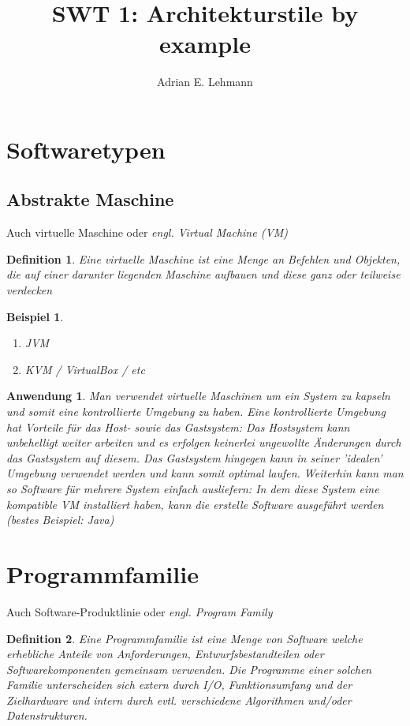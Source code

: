 \documentclass[a4paper]{article}
\title{SWT 1: Architekturstile by example}
\author{Adrian E. Lehmann}
\theoremstyle{break}
\newtheorem{defi}{Definition}[section]
\newtheorem{ex}{Beispiel}[section]
\newtheorem{why}{Anwendung}[section]
\begin{document}
	\maketitle
	\tableofcontents
	\newpage
	

\section{Softwaretypen}
\subsection{Abstrakte Maschine}
Auch virtuelle Maschine oder \textit{engl. Virtual Machine (VM)}
\begin{defi}
	Eine virtuelle Maschine ist eine Menge an Befehlen und Objekten, die auf einer darunter liegenden Maschine aufbauen und diese ganz oder teilweise verdecken
\end{defi}

\begin{ex}
\begin{enumerate}
	\item JVM
	\item KVM / VirtualBox / etc
\end{enumerate}
\end{ex}

\begin{why}
		Man verwendet virtuelle Maschinen um ein System zu kapseln und somit eine kontrollierte Umgebung zu haben. Eine kontrollierte Umgebung hat Vorteile für das Host- sowie das Gastsystem: Das Hostsystem kann unbehelligt weiter arbeiten und es erfolgen keinerlei ungewollte Änderungen durch das Gastsystem auf diesem. Das Gastsystem hingegen kann in seiner 'idealen' Umgebung verwendet werden und kann somit optimal laufen. Weiterhin kann man so Software für mehrere System einfach ausliefern: In dem diese System eine kompatible VM installiert haben, kann die erstelle Software ausgeführt werden (bestes Beispiel: Java)
\end{why}

\section{Programmfamilie}
Auch Software-Produktlinie oder \textit{engl. Program Family}
\begin{defi}
	Eine Programmfamilie ist eine Menge von Software welche erhebliche Anteile von Anforderungen, Entwurfsbestandteilen oder Softwarekomponenten gemeinsam verwenden.
	Die Programme einer solchen Familie unterscheiden sich extern durch I/O, Funktionsumfang und der Zielhardware und intern durch evtl. verschiedene Algorithmen und/oder Datenstrukturen.
\end{defi}
\end{document}

